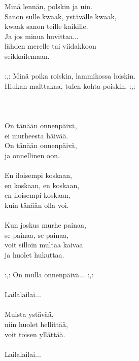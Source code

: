 
        Minä lennän, polskin ja uin. \\
        Sanon sulle kwaak, ystävälle kwaak, \\
        kwaak sanon teille kaikille. \\
        Ja jos minua huvittaa... \\
        lähden merelle tai viidakkoon \\
        seikkailemaan. \\
\hspace{10mm} \\
        :,: Minä poika roiskin, lammikossa loiskin. \\
        Hiukan malttakaa, tulen kohta poiskin. :,: \\
\hspace{10mm} \\
        [lallatusta] \\
\hspace{10mm} \\
        On tänään onnenpäivä, \\
        ei murheesta häivää. \\
        On tänään onnenpäivä, \\
        ja onnellinen oon. \\
\hspace{10mm} \\
        En iloisempi koskaan, \\
        en koskaan, en koskaan, \\
        en iloisempi koskaan, \\
        kuin tänään olla voi. \\
\hspace{10mm} \\
        Kun joskus murhe painaa, \\
        se painaa, se painaa, \\
        voit silloin multaa kaivaa \\
        ja huolet hukuttaa. \\
\hspace{10mm} \\
        :,: On mulla onnenpäivä... :,: \\
\hspace{10mm} \\
        Lailalailai... \\
\hspace{10mm} \\
        Muista ystävää, \\
        niin huolet hellittää, \\
        voit toisen yllättää. \\
\hspace{10mm} \\
        Lailalailai... \\

